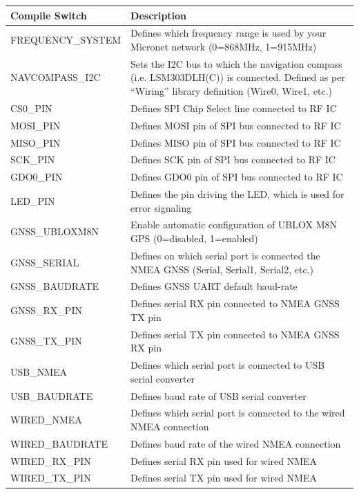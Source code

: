 \documentclass{report}
\begin{document}
\begin{table}[h]
	\begin{tabular}{|l|p{12cm}|}
		\hline
		\textbf{Compile Switch} & \textbf{Description}\\
		\hline
		FREQUENCY\_SYSTEM & Defines which frequency range is used by your Micronet network (0=868MHz, 1=915MHz)\\
		\hline
		NAVCOMPASS\_I2C & Sets the I2C bus to which the navigation compass (i.e. LSM303DLH(C)) is connected. Defined as per “Wiring” library definition (Wire0, Wire1, etc.)\\
		\hline
		CS0\_PIN & Defines SPI Chip Select line connected to RF IC\\
		\hline
		MOSI\_PIN & Defines MOSI pin of SPI bus connected to RF IC\\
		\hline
		MISO\_PIN & Defines MISO pin of SPI bus connected to RF IC\\
		\hline
		SCK\_PIN & Defines SCK pin of SPI bus connected to RF IC\\
		\hline
		GDO0\_PIN & Defines GDO0 pin of SPI bus connected to RF IC\\
		\hline
		LED\_PIN & Defines the pin driving the LED, which is used for error signaling\\
		\hline
		GNSS\_UBLOXM8N & Enable automatic configuration of UBLOX M8N GPS (0=disabled, 1=enabled)\\
		\hline
		GNSS\_SERIAL & Defines on which serial port is connected the NMEA GNSS (Serial, Serial1, Serial2, etc.)\\
		\hline
		GNSS\_BAUDRATE & Defines GNSS UART default baud-rate\\
		\hline
		GNSS\_RX\_PIN & Defines serial RX pin connected to NMEA GNSS TX pin\\
		\hline
		GNSS\_TX\_PIN & Defines serial TX pin connected to NMEA GNSS RX pin\\
		\hline
		USB\_NMEA & Defines which serial port is connected to USB serial converter\\
		\hline
		USB\_BAUDRATE & Defines baud rate of USB serial converter\\
		\hline
		WIRED\_NMEA & Defines which serial port is connected to the wired NMEA connection\\
		\hline
		WIRED\_BAUDRATE & Defines baud rate of the wired NMEA connection\\
		\hline
		WIRED\_RX\_PIN & Defines serial RX pin used for wired NMEA\\
		\hline
		WIRED\_TX\_PIN & Defines serial TX pin used for wired NMEA\\

\end{tabular}
\end{table}
\end{document}
